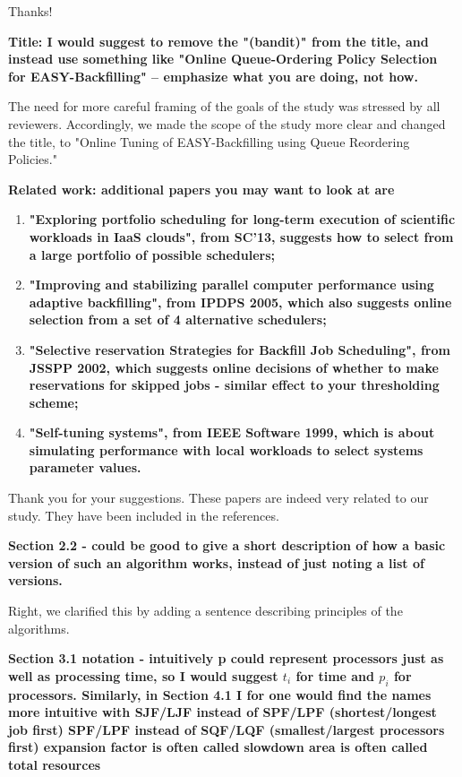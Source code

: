 \documentclass[]{article}
\begin{document}
Thanks!

\textbf{Title: I would suggest to remove the "(bandit)" from the title, and
instead use something like "Online Queue-Ordering Policy Selection for
EASY-Backfilling" -- emphasize what you are doing, not how.}

The need for more careful framing of the goals of the study was stressed by all
reviewers. Accordingly, we made the scope of the study more clear and changed
the title, to "Online Tuning of EASY-Backfilling using Queue Reordering
Policies."
\medskip

\textbf{Related work: additional papers you may want to look at are}
\begin{enumerate}

  \item \textbf{"Exploring portfolio scheduling for long-term execution of
    scientific workloads in IaaS clouds", from SC'13, suggests how to select
    from a large portfolio of possible schedulers;}

  \item \textbf{"Improving and stabilizing parallel computer performance using
    adaptive backfilling", from IPDPS 2005, which also suggests online
    selection from a set of 4 alternative schedulers;}

  \item \textbf{"Selective reservation Strategies for Backfill Job Scheduling",
    from JSSPP 2002, which suggests online decisions of whether to make
    reservations for skipped jobs - similar effect to your thresholding
    scheme;}

  \item \textbf{"Self-tuning systems", from IEEE Software 1999, which is about
    simulating performance with local workloads to select systems parameter
    values.}

\end{enumerate}
Thank you for your suggestions. These papers are indeed very related to our study. 
They have been included in the references. 

\textbf{Section 2.2 - could be good to give a short description of how a basic
    version of such an algorithm works, instead of just noting a list of
    versions.}

Right, we clarified this by adding a sentence describing principles of the algorithms.
\medskip

\textbf{Section 3.1 notation - intuitively p could represent processors just as
well as processing time, so I would suggest $t_i$ for time and $p_i$ for
processors.  Similarly, in Section 4.1 I for one would find the names more
intuitive with SJF/LJF instead of SPF/LPF (shortest/longest job first) SPF/LPF
instead of SQF/LQF (smallest/largest processors first) expansion factor is
often called slowdown area is often called total resources}
\end{document}
